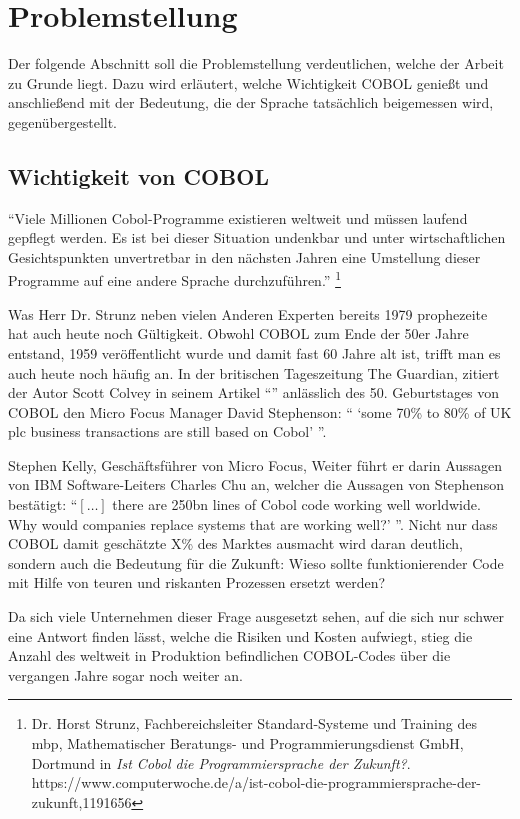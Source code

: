 \section{Problemstellung}
Der folgende Abschnitt soll die Problemstellung verdeutlichen, welche der Arbeit zu Grunde liegt. 
Dazu wird erläutert, welche Wichtigkeit COBOL genießt und anschließend mit der Bedeutung, die der Sprache tatsächlich beigemessen wird, gegenübergestellt.

\subsection{Wichtigkeit von COBOL}
``Viele Millionen Cobol-Programme existieren weltweit und müssen laufend gepflegt werden.
Es ist bei dieser Situation undenkbar und unter wirtschaftlichen Gesichtspunkten unvertretbar in den nächsten Jahren eine Umstellung dieser Programme auf eine andere Sprache durchzuführen.'' \footnote{Dr. Horst Strunz, Fachbereichsleiter Standard-Systeme und Training des mbp, Mathematischer Beratungs- und Programmierungsdienst GmbH, Dortmund in \textit{Ist Cobol die Programmiersprache der Zukunft?}. \\ https://www.computerwoche.de/a/ist-cobol-die-programmiersprache-der-zukunft,1191656}

Was Herr Dr. Strunz neben vielen Anderen Experten bereits 1979 prophezeite hat auch heute noch Gültigkeit. Obwohl COBOL zum Ende der 50er Jahre entstand, 1959 veröffentlicht wurde und damit fast 60 Jahre alt ist, trifft man es auch heute noch häufig an. In der britischen Tageszeitung The Guardian, zitiert der Autor Scott Colvey in seinem Artikel ``'' \cite{colvey_cobol_2009} anlässlich des 50. Geburtstages von COBOL den Micro Focus Manager David Stephenson: `` `some 70\% to 80\% of UK plc business transactions are still based on Cobol' ''. 

Stephen Kelly, Geschäftsführer von Micro Focus, 
Weiter führt er darin Aussagen von IBM Software-Leiters Charles Chu an, welcher die Aussagen von Stephenson bestätigt: ``$[\ldots]$ there are 250bn lines of Cobol code working well worldwide. Why would companies replace systems that are working well?' ''. 
Nicht nur dass COBOL damit geschätzte X\%  des Marktes ausmacht wird daran deutlich, sondern auch die Bedeutung für die Zukunft: Wieso sollte funktionierender Code mit Hilfe von teuren und riskanten Prozessen ersetzt werden?

Da sich viele Unternehmen dieser Frage ausgesetzt sehen, auf die sich nur schwer eine Antwort finden lässt, welche die Risiken und Kosten aufwiegt, stieg die Anzahl  des weltweit in Produktion befindlichen COBOL-Codes über die vergangen Jahre sogar noch weiter an.

